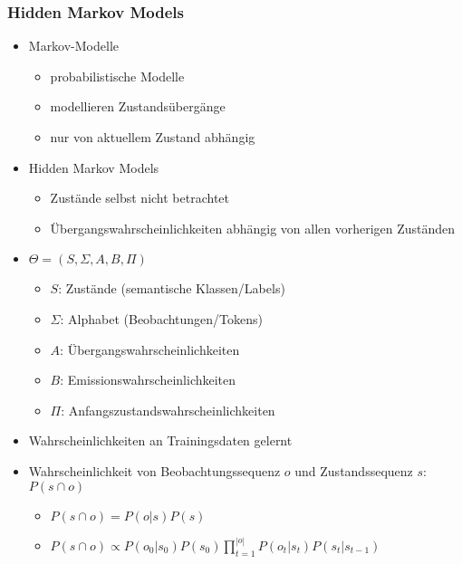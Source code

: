 \documentclass[nonacm=true, language=german]{acmart}
\begin{document}
\subsubsection{Hidden Markov Models}

\begin{itemize}
    \item Markov-Modelle
    \begin{itemize}
        \item probabilistische Modelle
        \item modellieren Zustandsübergänge
        \item nur von aktuellem Zustand abhängig
    \end{itemize}
    \item Hidden Markov Models
    \begin{itemize}
        \item Zustände selbst nicht betrachtet
        \item Übergangswahrscheinlichkeiten abhängig von allen vorherigen Zuständen
    \end{itemize}
    
    \item $ \Theta = (S, \Sigma, A, B, \Pi)$
    \begin{itemize}
        \item $S$: Zustände (semantische Klassen/Labels)
        \item $\Sigma$: Alphabet (Beobachtungen/Tokens)
        \item $A$: Übergangswahrscheinlichkeiten
        \item $B$: Emissionswahrscheinlichkeiten
        \item $\Pi$: Anfangszustandswahrscheinlichkeiten
    \end{itemize}
    
    \item Wahrscheinlichkeiten an Trainingsdaten gelernt
    \item Wahrscheinlichkeit von Beobachtungssequenz $o$ und Zustandssequenz $s$: $P(s \cap o)$
    \begin{itemize}
        \item $ P(s \cap o) = P(o | s) P(s) $
        \item $ P(s \cap o) \propto P(o_0 | s_0) P(s_0) \displaystyle \prod_{t=1}^{|o|} P(o_t | s_t) P(s_t | s_{t-1}) $
    \end{itemize}
    

\end{itemize}
\end{document}
